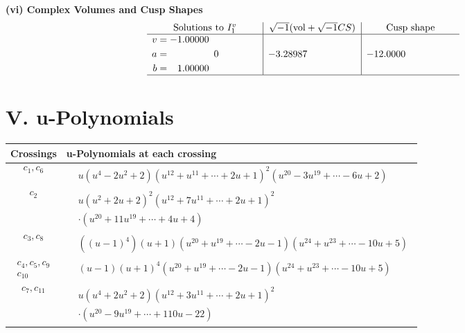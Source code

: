 \documentclass[1p]{elsarticle_modified}
\theoremstyle{definition}
\newcommand{\I}{\sqrt{-1}}
\begin{document}
\newpage\flushleft \textbf{(vi) Complex Volumes and Cusp Shapes}
$$\begin{array}{c|c|c}  
\text{Solutions to }I^v_{1}& \I (\text{vol} + \sqrt{-1}CS) & \text{Cusp shape}\\
 \hline 
\begin{aligned}
v &= -1.00000\phantom{ +0.000000I} \\
a &= \phantom{-0.000000 } 0 \\
b &= \phantom{-}1.00000\phantom{ +0.000000I}\end{aligned}
 & -3.28987\phantom{ +0.000000I} & -12.0000\phantom{ +0.000000I}\\
 \hline 
 \end{array}$$\newpage
\newpage\renewcommand{\arraystretch}{1}
\centering \section*{ V. u-Polynomials}
\begin{tabular}{m{50pt}|m{274pt}}
Crossings & \hspace{64pt}u-Polynomials at each crossing \\
\hline $$\begin{aligned}c_{1},c_{6}\end{aligned}$$&$\begin{aligned}
&u(u^4-2 u^2+2)(u^{12}+u^{11}+\cdots+2 u+1)^{2}(u^{20}-3 u^{19}+\cdots-6 u+2)
\end{aligned}$\\
\hline $$\begin{aligned}c_{2}\end{aligned}$$&$\begin{aligned}
&u(u^2+2 u+2)^2(u^{12}+7 u^{11}+\cdots+2 u+1)^{2}\\
&\cdot(u^{20}+11 u^{19}+\cdots+4 u+4)
\end{aligned}$\\
\hline $$\begin{aligned}c_{3},c_{8}\end{aligned}$$&$\begin{aligned}
&((u-1)^4)(u+1)(u^{20}+u^{19}+\cdots-2 u-1)(u^{24}+u^{23}+\cdots-10 u+5)
\end{aligned}$\\
\hline $$\begin{aligned}c_{4},c_{5},c_{9}\\c_{10}\end{aligned}$$&$\begin{aligned}
&(u-1)(u+1)^4(u^{20}+u^{19}+\cdots-2 u-1)(u^{24}+u^{23}+\cdots-10 u+5)
\end{aligned}$\\
\hline $$\begin{aligned}c_{7},c_{11}\end{aligned}$$&$\begin{aligned}
&u(u^4+2 u^2+2)(u^{12}+3 u^{11}+\cdots+2 u+1)^{2}\\
&\cdot(u^{20}-9 u^{19}+\cdots+110 u-22)
\end{aligned}$\\
\hline
\end{tabular}\newpage\renewcommand{\arraystretch}{1}
\end{document}
